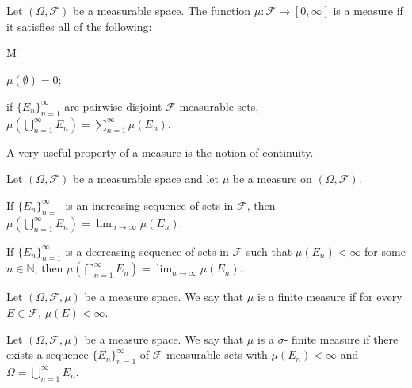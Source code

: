 \begin{definition}[a measure]
Let $(\Omega, \mathcal{F})$ be a measurable space. The function $\mu : \mathcal{F} \to [0, \infty]$ is a measure if it satisfies all of the following:
\begin{axioms}{M}
  \item \label{defn:measure:salg:M1} $\mu(\emptyset) = 0$;
  \item \label{defn:measure:salg:M2}  if $\{ E_n \}_{n=1}^\infty$ are pairwise disjoint $\mathcal{F}$-measurable sets, $\mu(\bigcup_{n=1}^\infty E_n) = \sum_{n=1}^\infty \mu(E_n)$.
\end{axioms}
\end{definition}
A very useful property of a measure is the notion of continuity.
\begin{lemma}
Let $(\Omega, \mathcal{F})$ be a measurable space and let $\mu$ be a measure on $(\Omega, \mathcal{F})$. 
\begin{description}
\item If $\{ E_n \}_{n = 1}^{\infty}$ is an increasing sequence of sets in $\mathcal{F}$, then $\mu \left (\bigcup_{n = 1} ^ {\infty} E_n \right) = \lim_{n \to \infty} \mu(E_n)$.
\item  If $\{ E_n \}_{n = 1}^{\infty}$  is a decreasing sequence of sets in $\mathcal{F}$ such that $\mu(E_n)< \infty$ for some $n \in \mathbb{N}$, then $    \mu \left (\bigcap_{n = 1} ^ {\infty} E_n \right) = \lim_{n \to \infty} \mu(E_n)$.
\end{description}
\end{lemma}
\begin{definition}
Let $(\Omega, \mathcal{F}, \mu)$ be a measure space. We say that $\mu$ is a finite measure if for every $E \in \mathcal{F}$, $\mu(E) < \infty$.
\end{definition}
\begin{definition}
Let $(\Omega, \mathcal{F}, \mu)$ be a measure space. We say that $\mu$ is a $\sigma$- finite measure if there exists a sequence $\{ E_n \}_{n = 1}^{\infty}$ of $\mathcal{F}$-measurable sets with $\mu(E_n) < \infty$ and $\Omega = \bigcup_{n=1}^\infty E_n$.
\end{definition}

